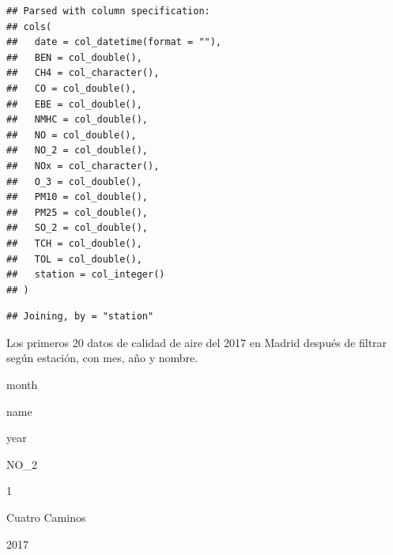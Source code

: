 \documentclass[]{book}
\newenvironment{Shaded}{\begin{snugshade}}{\end{snugshade}}
\newcommand{\DataTypeTok}[1]{\textcolor[rgb]{0.13,0.29,0.53}{#1}}
\newcommand{\DecValTok}[1]{\textcolor[rgb]{0.00,0.00,0.81}{#1}}
\newcommand{\KeywordTok}[1]{\textcolor[rgb]{0.13,0.29,0.53}{\textbf{#1}}}
\newcommand{\NormalTok}[1]{#1}
\newcommand{\OperatorTok}[1]{\textcolor[rgb]{0.81,0.36,0.00}{\textbf{#1}}}
\newcommand{\OtherTok}[1]{\textcolor[rgb]{0.56,0.35,0.01}{#1}}
\newcommand{\StringTok}[1]{\textcolor[rgb]{0.31,0.60,0.02}{#1}}
\begin{document}
\begin{Shaded}
\end{Shaded}

\begin{verbatim}
## Parsed with column specification:
## cols(
##   date = col_datetime(format = ""),
##   BEN = col_double(),
##   CH4 = col_character(),
##   CO = col_double(),
##   EBE = col_double(),
##   NMHC = col_double(),
##   NO = col_double(),
##   NO_2 = col_double(),
##   NOx = col_character(),
##   O_3 = col_double(),
##   PM10 = col_double(),
##   PM25 = col_double(),
##   SO_2 = col_double(),
##   TCH = col_double(),
##   TOL = col_double(),
##   station = col_integer()
## )
\end{verbatim}

\begin{verbatim}
## Joining, by = "station"
\end{verbatim}

\label{tab:Madrid2017d}Los primeros 20 datos de calidad de aire del 2017 en
Madrid después de filtrar según estación, con mes, año y nombre.

month

name

year

NO\_2

1

Cuatro Caminos

2017
\end{document}
